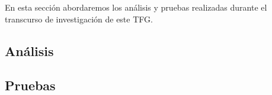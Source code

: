 \documentclass[../main.tex]{subfiles}
\begin{document}
En esta sección abordaremos los análisis y pruebas realizadas durante el transcurso de investigación de este TFG.

\subsection{Análisis}
\blindtext

\subsection{Pruebas}
\blindtext
\end{document}
